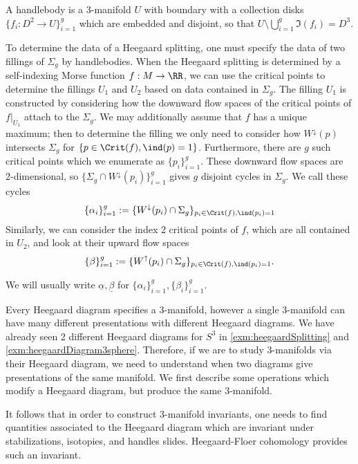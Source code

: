 



A handlebody is a 3-manifold $U$ with boundary with a collection disks $\{f_i: D^2\to U\}_{i=1}^g$ which are embedded and disjoint, so that $U\setminus \bigcup_{i=1}^g \Im(f_i)=D^3$. 



To determine the data of a Heegaard splitting, one must specify the data of two fillings of $\Sigma_g$ by handlebodies. When the Heegaard splitting is determined by a self-indexing Morse function $f: M\to \RR$, we can use the critical points to determine the fillings $U_1$ and $U_2$ based on data contained in $\Sigma_g$. The filling $U_1$ is constructed by considering how the downward flow spaces of the critical points of $f|_{U_1}$ attach to the $\Sigma_g$. We may additionally assume  that $f$ has a unique maximum; then to determine the filling we only need to consider how $W^\downarrow(p)$ intersects $\Sigma_g$ for $\{p\in \Crit(f), \ind(p)=1\}$. Furthermore, there are $g$ such critical points which we enumerate as $\{p_i\}_{i=1}^g$. These downward flow spaces are 2-dimensional, so $\{\Sigma_g\cap W^\downarrow(p_i)\}_{i=1}^g$ gives $g$ disjoint cycles in $\Sigma_g$. We call these cycles 
\[\{\alpha_i\}_{i=1}^g:=\{ W^\downarrow(p_i)\cap \Sigma_g\}_{p_i\in \Crit(f), \ind(p_i)=1}\]
Similarly, we can consider the index 2 critical points of $f$, which are all contained in $U_2$, and look at their upward flow spaces
\[\{\beta\}_{i=1}^g:=\{ W^\uparrow(p_i)\cap \Sigma_g\}_{p_i\in \Crit(f), \ind(p_i)=1}.\]

We will usually write $\underline \alpha, \underline \beta$ for $\{\alpha_i\}_{i=1}^g, \{\beta_i\}_{i=1}^g$.

Every Heegaard diagram specifies a 3-manifold, however a single 3-manifold can have many different presentations with different Heegaard diagrams. We have already seen 2 different Heegaard diagrams for $S^3$ in \cref{exm:heegaardSplitting} and  \cref{exm:heegaardDiagram3sphere}. 
Therefore, if we are to study 3-manifolds via their Heegaard diagram, we need to understand when two diagrams give presentations of the same manifold. We first describe some operations which modify a Heegaard diagram, but produce the same 3-manifold. 





It follows that in order to construct 3-manifold invariants, one needs to find  quantities associated to the Heegaard diagram which are invariant under stabilizations, isotopies, and handles slides. Heegaard-Floer cohomology provides such an invariant.